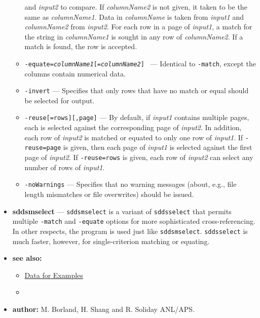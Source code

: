 \begin{itemize}
\begin{itemize}
        and {\em input2} to compare.  If {\em columnName2} is not given, it taken to be the same as {\em columnName1}.
        Data in {\em columnName} is taken from {\em input1} and {\em columnName2} from {\em input2}.  For each row in a page
        of {\em input1}, a match for the string in {\em columnName1} is sought in any row of {\em columnName2}.  If a match
        is found, the row is accepted.
    \item {\tt -equate={\em columnName1}[={\em columnName2}] } --- Identical to {\tt -match}, except the columns contain
        numerical data.
    \item {\tt -invert} --- Specifies that only rows that have no match or equal should be selected for output.
    \item {\tt -reuse[=rows][,page]} --- By default, if {\em input1}  contains multiple pages, each is selected against
        the corresponding page of {\em input2}.  In addition, each row of {\em input2} is matched or equated to only
        one row of {\em input1}.  If {\tt -reuse=page} is given, then each page of {\em input1}
        is selected against the first page of {\em input2}.   If {\tt -reuse=rows} is given, each row of {\em input2}
        can select any number of rows of {\em input1}.
    \item {\tt -noWarnings} --- Specifies that no warning messages (about, e.g., file length mismatches
        or file overwrites) should be issued.
    \end{itemize}
\item {\bf sddsmselect} --- {\tt sddsmselect} is a variant of {\tt sddsselect} that permits multiple {\tt -match}
 and {\tt -equate} options for more sophisticated cross-referencing.  In other respects, the program is
 used just like {\tt sddsmselect}.  {\tt sddsselect} is much faster, however, for single-criterion matching or
 equating.
\item {\bf see also:}
    \begin{itemize}
    \item \hyperref[exampleData]{Data for Examples}
    \item {}
    \end{itemize}
\item {\bf author:} M. Borland, H. Shang and R. Soliday ANL/APS.
\end{itemize}





